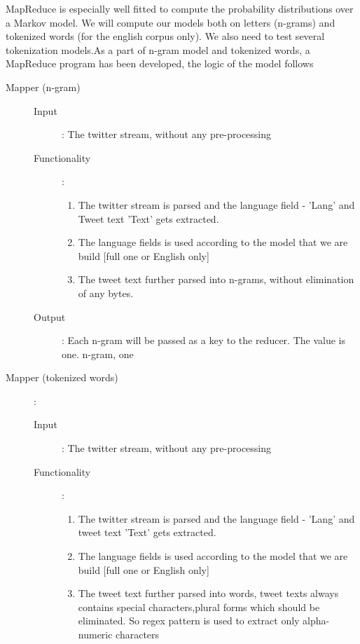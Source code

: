 \documentclass[a4paper,11pt]{article}
\begin{document}
MapReduce is especially well fitted to compute the probability distributions over a Markov model. We will compute our models both on letters (n-grams) and tokenized words (for the english corpus only). We also need to test several tokenization models.As a part of n-gram model and tokenized words, a MapReduce program has been developed, the logic of the model follows
\begin{flushleft}

\begin{description}

\item[Mapper (n-gram)]

\begin{description}
\item[Input]: The twitter stream, without any pre-processing

\item[Functionality]: \begin{enumerate} 
          \item The twitter stream is parsed and the language field - 'Lang'	and Tweet text 'Text' gets extracted.
	\item The language fields is used according to the model that we are build [full one or English only]
          \item The tweet text further parsed into n-grams, without elimination of any bytes.
\end{enumerate}

\item[Output]: Each n-gram will be passed as a key to the reducer. The value is one. {n-gram, one}
\end{description}

\item[Mapper (tokenized words)]:

\begin{description}
\item[Input]: The twitter stream, without any pre-processing

\item[Functionality]: \begin{enumerate}
	\item  The twitter stream is parsed and the language field - 'Lang' and tweet text 'Text' gets extracted.
	\item The language fields is used according to the model that we are build [full one or English only]
	\item The tweet text further parsed into words, tweet texts always contains special characters,plural forms which should be eliminated. So regex pattern is used to extract only alpha-numeric characters
\end{enumerate} 


\end{description}
\end{description}
\end{flushleft}
\end{document}
